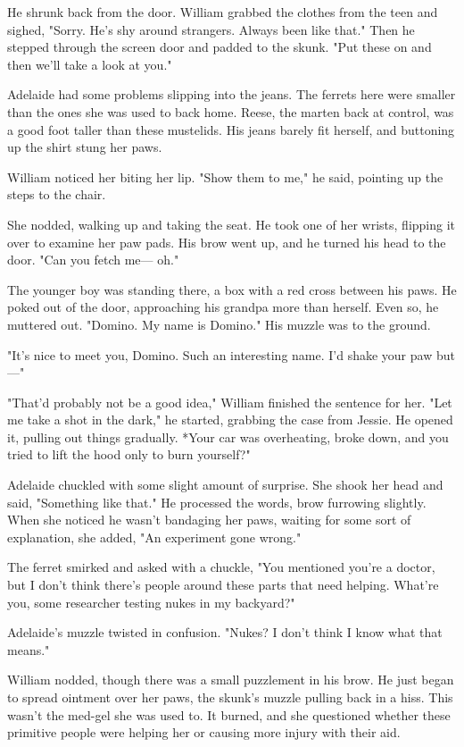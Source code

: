 He shrunk back from the door. William grabbed the clothes from the teen and sighed, "Sorry. He's shy around strangers. Always been like that." Then he stepped through the screen door and padded to the skunk. "Put these on and then we'll take a look at you."

Adelaide had some problems slipping into the jeans. The ferrets here were smaller than the ones she was used to back home. Reese, the marten back at control, was a good foot taller than these mustelids. His jeans barely fit herself, and buttoning up the shirt stung her paws.

William noticed her biting her lip. "Show them to me," he said, pointing up the steps to the chair.

She nodded, walking up and taking the seat. He took one of her wrists, flipping it over to examine her paw pads. His brow went up, and he turned his head to the door. "Can you fetch me--- oh."

The younger boy was standing there, a box with a red cross between his paws. He poked out of the door, approaching his grandpa more than herself. Even so, he muttered out. "Domino. My name is Domino." His muzzle was to the ground.

"It's nice to meet you, Domino. Such an interesting name. I'd shake your paw but---"

"That'd probably not be a good idea," William finished the sentence for her. "Let me take a shot in the dark," he started, grabbing the case from Jessie. He opened it, pulling out things gradually. *Your car was overheating, broke down, and you tried to lift the hood only to burn yourself?"

Adelaide chuckled with some slight amount of surprise. She shook her head and said, "Something like that." He processed the words, brow furrowing slightly. When she noticed he wasn't bandaging her paws, waiting for some sort of explanation, she added, "An experiment gone wrong."

The ferret smirked and asked with a chuckle, "You mentioned you're a doctor, but I don't think there's people around these parts that need helping. What're you, some researcher testing nukes in my backyard?"

Adelaide's muzzle twisted in confusion. "Nukes? I don't think I know what that means."

William nodded, though there was a small puzzlement in his brow. He just began to spread ointment over her paws, the skunk's muzzle pulling back in a hiss. This wasn't the med-gel she was used to. It burned, and she questioned whether these primitive people were helping her or causing more injury with their aid.

